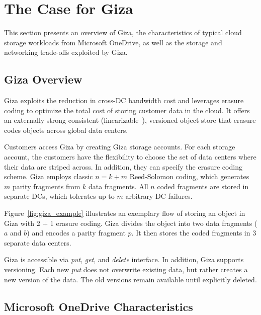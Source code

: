 
\section{The Case for Giza}
\label{sec:motivation}


This section presents an overview of Giza, 
the characteristics of typical cloud storage workloads from Microsoft OneDrive,
as well as the storage and networking trade-offs exploited by Giza.


\subsection{Giza Overview}

Giza exploits the reduction in cross-DC bandwidth cost and leverages erasure
coding to optimize the total cost of storing customer data in the cloud. It
offers an externally strong consistent
(linearizable~\cite{herlihy90linearizability}), versioned object store that
erasure codes objects across global data centers.

Customers access Giza by creating Giza storage accounts. For each storage
account, the customers have the flexibility to choose the set of data centers
where their data are striped across. In addition, they can specify the erasure
coding scheme. Giza employs classic $n = k + m$ Reed-Solomon coding, which
generates $m$ parity fragments from $k$ data fragments. All $n$ coded fragments
are stored in separate DCs, which tolerates up to $m$ arbitrary DC failures.

Figure~\ref{fig:giza_example} illustrates an exemplary flow of storing an object
in Giza with 2 + 1 erasure coding. Giza divides the object into two data
fragments ($a$ and $b$) and encodes a parity fragment $p$. It then stores the
coded fragments in $3$ separate data centers.

Giza is accessible via {\em put}, {\em get}, and {\em delete} interface. In
addition, Giza supports versioning. Each new {\em put} does not overwrite
existing data, but rather creates a new version of the data. The old versions
remain available until explicitly deleted.

\subsection{Microsoft OneDrive Characteristics}

